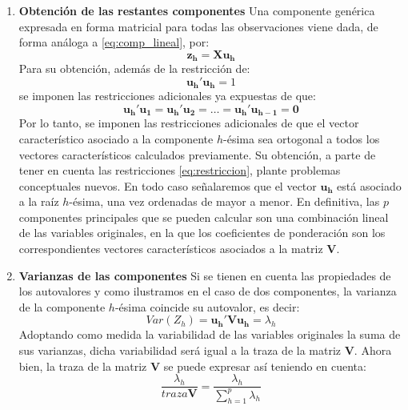 \begin{enumerate}
\begin{enumerate}
        \item \textbf{Obtención de las restantes componentes} Una componente genérica expresada en forma matricial para todas las observaciones viene dada, de forma análoga a \eqref{eq:comp_lineal}, por:
        \begin{equation}
            \mathbf{z_h}=\mathbf{Xu_h}
            \label{eq:comp_lineal_res}
        \end{equation}
        Para su obtención, además de la restricción de:
        \begin{equation}
            \mathbf{u_h'u_h}=1
            \label{eq:restriccion}
        \end{equation}
        se imponen las restricciones adicionales ya expuestas de que:
        \begin{equation}
            \mathbf{u_h'u_1}=\mathbf{u_h'u_2}=\ldots=\mathbf{u_h'u_{h-1}=0}
            \label{eq:restriccion}
        \end{equation}
        Por lo tanto, se imponen las restricciones adicionales de que el vector característico asociado a la componente $h$-\'esima sea ortogonal a todos los vectores característicos calculados previamente. Su obtención, a parte de tener en cuenta las restricciones \eqref{eq:restriccion}, plante problemas conceptuales nuevos. En todo caso señalaremos que el vector $\mathbf{u_h}$ está asociado a la raíz $h$-\'esima, una vez ordenadas de mayor a menor. En definitiva, las $p$ componentes principales que se pueden calcular son una combinación lineal de las variables originales, en la que los coeficientes de ponderación son los correspondientes vectores característicos asociados a la matriz $\mathbf{V}$.
        \item \textbf{Varianzas de las componentes} Si se tienen en cuenta las propiedades de los autovalores y como ilustramos en el caso de dos componentes, la varianza de la componente $h$-\'esima coincide su autovalor, es decir:
        \begin{equation}
            Var(Z_h)=\mathbf{u_h'Vu_h}=\lambda_{h}
        \end{equation}
        Adoptando como medida la variabilidad de las variables originales la suma de sus varianzas, dicha variabilidad será igual a la traza de la matriz $\mathbf{V}$. Ahora bien, la traza de la matriz $\mathbf{V}$ se puede expresar así teniendo en cuenta:
        \begin{equation}
            \frac{\lambda_{h}}{traza\mathbf{V}}=\frac{\lambda_h}{\sum\limits_{h = 1}^{p}\lambda_h}
        \end{equation}

\end{enumerate}
\end{enumerate}
